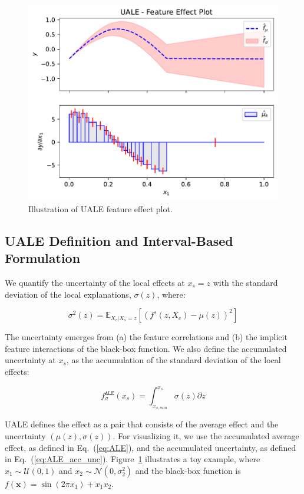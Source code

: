 \documentclass[twoside]{article}
\newcommand{\dfdx}{f^s}
\newcommand{\xb}{\mathbf{x}}
\begin{document}
\begin{figure}
  \centering
  \includegraphics[width=.5\textwidth]{concept_figure/fig-1.pdf}
  \caption{Illustration of UALE feature effect plot.}
  \label{fig:UALE-figure}
\end{figure}

\subsection{UALE Definition and Interval-Based Formulation}
\label{sec:UALE-definition-1}

We quantify the uncertainty of the local effects at \(x_s=z\) with the standard deviation of the local explanations, \(\sigma(z)\), where:

\begin{equation}
  \label{eq:ALE_var}
  \sigma^2(z) = \mathbb{E}_{X_c|X_s=z}\left [ \left (\dfdx (z, X_c) - \mu(z) \right )^2 \right ] 
\end{equation}

\noindent
The uncertainty emerges from (a) the feature correlations and (b) the implicit feature interactions of the black-box function. We also define the accumulated uncertainty at \(x_s\), as the accumulation of the standard deviation of the local effects:

\begin{equation}
  \label{eq:ALE_acc_unc}
  f^{\mathtt{ALE}}_{\sigma}(x_s) = \int_{x_{s, min}}^{x_s} \sigma(z) \partial z
\end{equation}
\noindent

UALE defines the effect as a pair that consists of the average effect and the uncertainty \((\mu(z), \sigma(z))\). For visualizing it, we use the accumulated average effect, as defined in Eq.~(\ref{eq:ALE}), and the accumulated uncertainty, as defined in Eq.~(\ref{eq:ALE_acc_unc}). Figure~\ref{fig:UALE-figure} illustrates a toy example, where \(x_1 \sim \mathcal{U}(0,1)\) and \(x_2 \sim \mathcal{N}(0,\sigma^2_2)\) and the black-box function is \(f(\xb)= \sin(2 \pi x_1) + x_1x_2\).
\end{document}
